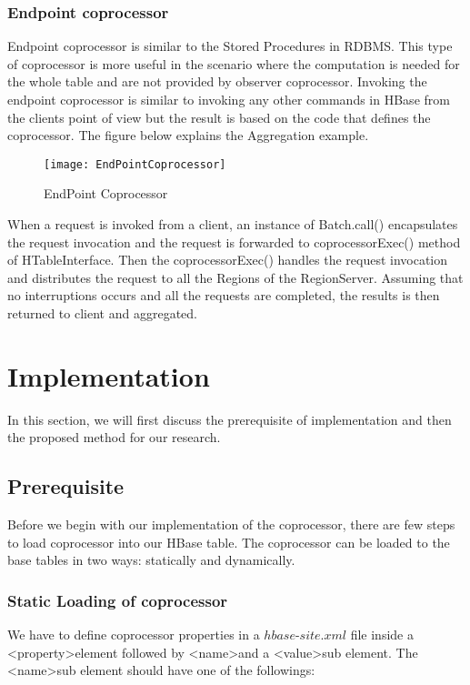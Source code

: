 \documentclass[11pt,a4paper,bibtotoc,idxtotoc,headsepline,footsepline,footexclude,BCOR12mm,DIV13]{scrbook}
\begin{document}
\newpage
\subsection{Endpoint coprocessor}

Endpoint coprocessor is similar to the Stored Procedures in RDBMS. This type of coprocessor is more useful in the scenario where the computation is needed for the whole table and are not provided by observer coprocessor\cite{hbase:coprocessors}. Invoking the endpoint coprocessor is similar to invoking any other commands in HBase from the client\textquotesingle s point of view but the result is based on the code that defines the coprocessor\cite{coprocessor:detail}. The figure below explains the Aggregation example\cite{coprocessor:detail}.

\begin{figure}
    \centering
    \texttt{[image: EndPointCoprocessor]}
    \caption{EndPoint Coprocessor}
    
\end{figure}

When a request is invoked from a client, an instance of Batch.call() encapsulates the request invocation and the request is forwarded to coprocessorExec() method of HTableInterface. Then the coprocessorExec() handles the request invocation and distributes the request to all the Regions of the RegionServer. Assuming that no interruptions occurs and all the requests are completed, the results is then returned to client and aggregated\cite{coprocessor:detail}.


\newpage
\chapter{Implementation}
In this section, we will first discuss the prerequisite of implementation and then the proposed method for our research.

\section{Prerequisite}
Before we begin with our implementation of the coprocessor, there are few steps to load coprocessor into our HBase table. The coprocessor can be loaded to the base tables in two ways: statically and dynamically\cite{loading:coprocessors}. 

\subsection{Static Loading of coprocessor}
We have to define coprocessor properties in a $hbase$-$site.xml$ file inside a \textless property\textgreater \space element followed by \textless name\textgreater \space and a \textless value\textgreater \space sub element. The \textless name\textgreater \space sub element should have one of the followings\cite{hbase:site}:
\end{document}
